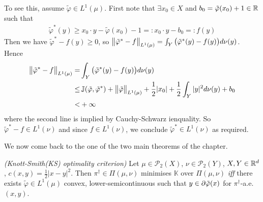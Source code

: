 \documentclass[12pt,a4paper]{article}
\renewenvironment{i}
{\begin{itemize} 
	}%
	{\end{itemize}
}
\begin{document}
\begin{i}
To see this, assume $\tilde{\varphi}\in L^1(\mu)$. First note that $\exists x_0 \in X$ and $b_0 = \tilde{\varphi}(x_0) +1 \in \mathbb{R}$ such that
\begin{align*}
\tilde{\varphi}^*(y) \geq x_0 \cdot y - \tilde{\varphi}(x_0) -1 =: x_0 \cdot y - b_0 =: f(y)
\end{align*} 
Then we have $\tilde{\varphi}^* - f(y) \geq 0$, so $\bigl\lVert\tilde{\varphi}^* - f\bigr\rVert_{L^1(\mu)} = \int_Y \big( \tilde{\varphi}^*(y) - f(y) \big) d\nu(y)$. Hence
\begin{align*}
\bigl\lVert\tilde{\varphi}^* - f\bigr\rVert_{L^1(\mu)} =& \int_Y \big( \tilde{\varphi}^*(y) - f(y) \big) d\nu(y) \\
\leq & \, \mathbb{J} (\tilde{\varphi}, \tilde{\varphi}^*) + \bigl\lVert\tilde{\varphi}\bigr\rVert_{L^1(\mu)} + \frac{1}{2} |x_0| + \frac{1}{2} \int_Y |y|^2 d\nu(y) + b_0 \\
<&  +\infty
\end{align*}
where the second line is implied by Cauchy-Schwarz ienquality. So $\tilde{\varphi}^* - f\in L^1(\nu)$ and since $f\in L^1(\nu)$, we conclude $\tilde{\varphi}^* \in L^1(\nu)$ as required.

\end{i}
\s

We now come back to the one of the two main theorems of the chapter.
\s

 \emph{(Knott-Smith(KS) optimality criterion)} Let $\mu \in \mathscr{P}_2(X)$, $\nu \in \mathscr{P}_2(Y)$, $X, Y\in \mathbb{R}^d$, $c(x,y) = \frac{1}{2} |x-y|^2$. Then $\pi^{\dagger} \in \Pi(\mu, \nu)$ minimises $\mathbb{K}$ over $\Pi(\mu, \nu)$ \emph{iff} there exists $\tilde{\varphi} \in L^1(\mu)$ convex, lower-semicontinuous such that $y\in \partial \tilde{\varphi}(x)$ for $\pi^{\dagger}$-a.e. $(x,y)$.
\end{document}
